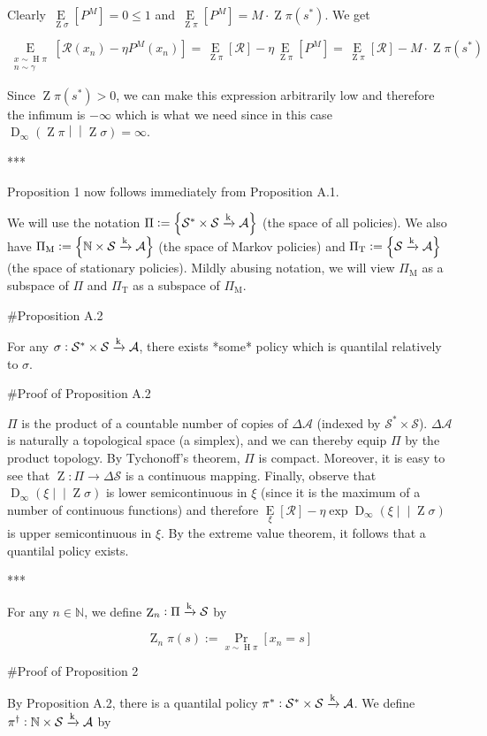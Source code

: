 \documentclass[a4paper]{article}
\newcommand{\AP}[1]{\left(#1\right)}
\newcommand{\AB}[1]{\left[#1\right]}
\newcommand{\AC}[1]{\left\{#1\right\}}
\newcommand{\Pa}[2]{\underset{#1}{\operatorname{Pr}}\AB{#2}}
\newcommand{\Ea}[2]{\underset{#1}{\operatorname{E}}\AB{#2}}
\newcommand{\RD}[3]{\operatorname{D}_{#1}\AP{#2\middle\vert\middle\vert#3}}
\newcommand{\Nats}{\mathbb{N}}
\newcommand{\K}{\xrightarrow{\textnormal{k}}}
\newcommand{\A}{\mathcal{A}}
\newcommand{\St}{\mathcal{S}}
\newcommand{\R}{\mathcal{R}}
\newcommand{\Pe}{P}
\DeclareMathOperator{\Hi}{H}
\DeclareMathOperator{\Z}{Z}
\begin{document}
Clearly $\Ea{\Z{\sigma}}{\Pe^M} = 0 \leq 1$ and $\Ea{\Z{\pi}}{P^M} = M \cdot \Z{\pi}\AP{s^*}$. We get

$$\Ea{\substack{x\sim\Hi{\pi}\\n\sim\gamma}}{\R\AP{x_n}-\eta\Pe^M\AP{x_n}} = \Ea{\Z{\pi}}{\R} - \eta \Ea{\Z{\pi}}{\Pe^M} = \Ea{\Z{\pi}}{\R} - M \cdot \Z{\pi}\AP{s^*}$$

Since $\Z{\pi}\AP{s^*} > 0$, we can make this expression arbitrarily low and therefore the infimum is $-\infty$ which is what we need since in this case $\RD{\infty}{\Z{\pi}}{\Z{\sigma}} = \infty$.

***

Proposition 1 now follows immediately from Proposition A.1.

We will use the notation $\Pi:=\AC{\St^* \times \St \K \A}$ (the space of all policies). We also have $\Pi_{\text{M}}:=\AC{\Nats \times \St \K \A}$ (the space of Markov policies) and $\Pi_{\text{T}}:=\AC{ \St \K \A}$ (the space of stationary policies). Mildly abusing notation, we will view $\Pi_{\text{M}}$ as a subspace of $\Pi$ and $\Pi_{\text{T}}$ as a subspace of $\Pi_{\text{M}}$.

\#Proposition A.2

For any $\sigma: \St^* \times \St \K \A$, there exists *some* policy which is quantilal relatively to $\sigma$.

\#Proof of Proposition A.2

$\Pi$ is the product of a countable number of copies of $\Delta\A$ (indexed by $\St^* \times \St$). $\Delta\A$ is naturally a topological space (a simplex), and we can thereby equip $\Pi$ by the product topology. By Tychonoff's theorem, $\Pi$ is compact. Moreover, it is easy to see that $\Z: \Pi \rightarrow \Delta\St$ is a continuous mapping. Finally, observe that $\RD{\infty}{\xi}{\Z{\sigma}}$ is lower semicontinuous in $\xi$ (since it is the maximum of a number of continuous functions) and therefore $\Ea{\xi}{\R} - \eta\exp{\RD{\infty}{\xi}{\Z{\sigma}}}$ is upper semicontinuous in $\xi$. By the extreme value theorem, it follows that a quantilal policy exists.

***

For any $n\in\Nats$, we define $\Z_n: \Pi \K \St$ by 

$$\Z_n{\pi}(s) := \Pa{x\sim\Hi{\pi}}{x_n=s}$$

\#Proof of Proposition 2

By Proposition A.2, there is a quantilal policy $\pi^*: \St^* \times \St \K \A$. We define $\pi^\dagger: \Nats \times \St \K \A$ by
\end{document}

